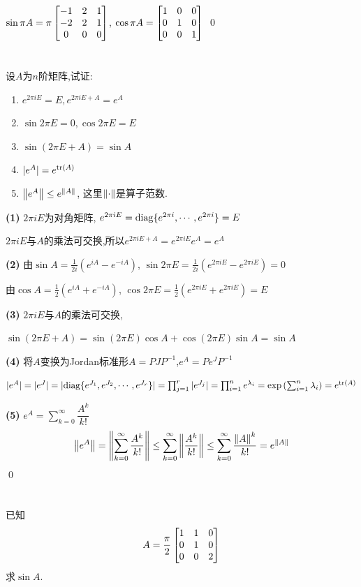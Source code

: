 \documentclass{matrix-homework}
\begin{document}
$\sin \pi A=\pi \begin{bmatrix}-1&2&1\\-2&2&1\\0&0&0\end{bmatrix}$, $\cos \pi A=\begin{bmatrix}1&0&0\\0&1&0\\0&0&1\end{bmatrix}$
\qed

\newpage
\section{}
设$A$为$n$阶矩阵,试证:
\begin{enumerate}[label=(\arabic*)]
    \item $e^{2\pi iE}=E, e^{2\pi iE+A}=e^A$
    \item $\sin 2\pi E=0, \cos 2\pi E=E$
    \item $\sin(2\pi E+A)=\sin A$
    \item $|e^A|=e^{\mathrm{tr}(A)}$
    \item $\left\lVert e^A \right\rVert\le e^{\left\lVert A \right\rVert}$, 这里$\left\lVert \cdot \right\rVert$是算子范数.
\end{enumerate}

\answer
\textbf{(1)} $2\pi i E$为对角矩阵, $e^{2\pi iE}=\mathrm{diag}\{e^{2\pi i},\cdots,e^{2\pi i}\}=E$

$2\pi i E$与$A$的乘法可交换,所以$e^{2\pi iE+A}=e^{2\pi iE}e^A=e^A$

\textbf{(2)} 由$\sin A=\frac{1}{2i}(e^{iA}-e^{-iA})$, $\sin 2\pi E=\frac{1}{2i}(e^{2\pi iE}-e^{2\pi iE})=0$

由$\cos A=\frac{1}{2}(e^{iA}+e^{-iA})$, $\cos 2\pi E=\frac{1}{2}(e^{2\pi iE}+e^{2\pi iE})=E$

\textbf{(3)} $2\pi i E$与$A$的乘法可交换,

$\sin(2\pi E+A)=\sin(2\pi E)\cos A + \cos(2\pi E)\sin A = \sin A$

\textbf{(4)} 将$A$变换为Jordan标准形$A=PJP^{-1}$,$e^A=Pe^JP^{-1}$

$|e^A|=|e^J|=|\mathrm{diag}\{e^{J_1},e^{J_2},\cdots,e^{J_r}\}|=
    \prod_{j=1}^r |e^{J_j}|=\prod_{i=1}^n e^{\lambda_i}=\exp\left(\sum_{i=1}^{n}\lambda_i\right)= e^{\mathrm{tr}(A)}$

\textbf{(5)} $e^A=\sum_{k=0}^{\infty}\dfrac{A^k}{k!}$
\begin{align*}
    \left\lVert e^A \right\rVert=
    \left\lVert \sum_{k=0}^{\infty}\frac{A^k}{k!} \right\rVert
    \le\sum_{k=0}^{\infty}\left\lVert \frac{A^k}{k!} \right\rVert
    \le\sum_{k=0}^{\infty}\frac{\left\lVert A \right\rVert^k}{k!}
    =e^{\left\lVert A \right\rVert}
\end{align*}
\qed

\newpage
\section{}
已知$$A=\frac{\pi}{2}\begin{bmatrix}1&1&0\\0&1&0\\0&0&2\end{bmatrix}$$求$\sin A$.
\end{document}
